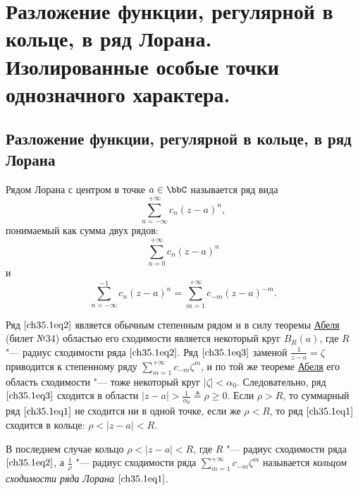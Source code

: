 \chapter{Разложение функции, регулярной в кольце, в ряд Лорана. Изолированные особые точки однозначного характера.}

\section{Разложение функции, регулярной в кольце, в ряд Лорана}

\begin{leftbar}
\begin{defn}
Рядом Лорана с центром в точке $a \in \bbC$ называется ряд вида
\begin{equation} \label{ch35.1eq1}
\sum\limits_{n = -\infty}^{+\infty} c_n (z - a)^n,
\end{equation}
понимаемый как сумма двух рядов:
\begin{equation} \label{ch35.1eq2}
\sum\limits_{n = 0}^{+\infty} c_n (z - a)^n
\end{equation}
и
\begin{equation} \label{ch35.1eq3}
\sum\limits_{n = -\infty}^{-1} c_n (z - a)^n = \sum\limits_{m = 1}^{+\infty} c_{-m} (z - a)^{-m}.
\end{equation}
\end{defn}


Ряд $\eqref{ch35.1eq2}$ является обычным степенным рядом и в силу теоремы \hyperref[ch34.2Thm1]{Абеля} (билет №34) областью его сходимости является некоторый круг $B_R(a)$, где $R$ "--- радиус сходимости ряда $\eqref{ch35.1eq2}$. Ряд $\eqref{ch35.1eq3}$ заменой $\frac{1}{z - a} = \zeta$ приводится к степенному ряду $\sum\limits_{m = 1}^{+\infty}c_{-m} \zeta^m$, и по той же теореме \hyperref[ch34.2Thm1]{Абеля} его область сходимости "--- тоже некоторый круг $|\zeta| < \alpha_0$. Следовательно, ряд $\eqref{ch35.1eq3}$ сходится в области $|z - a| > \frac{1}{\alpha_0} \triangleq \rho \ge 0$. Если $\rho > R$, то суммарный ряд $\eqref{ch35.1eq1}$ не сходится ни в одной точке, если же $\rho < R$, то ряд $\eqref{ch35.1eq1}$ сходится в кольце: $\rho < |z - a| < R$.

В последнем случае кольцо $\rho < |z - a| < R$, где $R$ "--- радиус сходимости ряда $\eqref{ch35.1eq2}$, а $\frac{1}{\rho}$ "--- радиус сходимости ряда $\sum\limits_{m = 1}^{+\infty} c_{-m} \zeta^m$ называется \textit{кольцом сходимости ряда Лорана} $\eqref{ch35.1eq1}$.
\end{leftbar}

